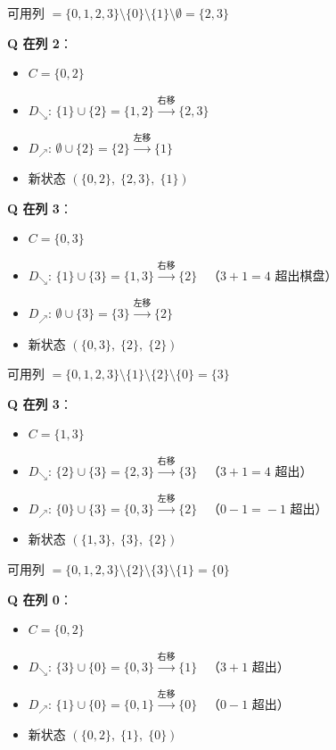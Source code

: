 \documentclass[12pt,a4paper]{article}
\begin{document}
\begin{stepbox}[S1: $(C=\{0\},\; D_\searrow=\{1\},\; D_\nearrow=\emptyset)$]
可用列 $= \{0,1,2,3\} \setminus \{0\} \setminus \{1\} \setminus \emptyset = \{2, 3\}$

\textbf{Q 在列 2}：
\begin{itemize}[nosep]
  \item $C = \{0,2\}$
  \item $D_\searrow$: $\{1\} \cup \{2\} = \{1,2\} \xrightarrow{\text{右移}} \{2,3\}$
  \item $D_\nearrow$: $\emptyset \cup \{2\} = \{2\} \xrightarrow{\text{左移}} \{1\}$
  \item 新状态 $(\{0,2\},\;\{2,3\},\;\{1\})$
\end{itemize}

\textbf{Q 在列 3}：
\begin{itemize}[nosep]
  \item $C = \{0,3\}$
  \item $D_\searrow$: $\{1\} \cup \{3\} = \{1,3\} \xrightarrow{\text{右移}} \{2\}$ \ \small（$3\!+\!1\!=\!4$ 超出棋盘）
  \item $D_\nearrow$: $\emptyset \cup \{3\} = \{3\} \xrightarrow{\text{左移}} \{2\}$
  \item 新状态 $(\{0,3\},\;\{2\},\;\{2\})$
\end{itemize}
\end{stepbox}

\begin{stepbox}[S2: $(C=\{1\},\; D_\searrow=\{2\},\; D_\nearrow=\{0\})$]
可用列 $= \{0,1,2,3\} \setminus \{1\} \setminus \{2\} \setminus \{0\} = \{3\}$

\textbf{Q 在列 3}：
\begin{itemize}[nosep]
  \item $C = \{1,3\}$
  \item $D_\searrow$: $\{2\} \cup \{3\} = \{2,3\} \xrightarrow{\text{右移}} \{3\}$ \ \small（$3\!+\!1\!=\!4$ 超出）
  \item $D_\nearrow$: $\{0\} \cup \{3\} = \{0,3\} \xrightarrow{\text{左移}} \{2\}$ \ \small（$0\!-\!1\!=\!-1$ 超出）
  \item 新状态 $(\{1,3\},\;\{3\},\;\{2\})$
\end{itemize}
\end{stepbox}

\begin{stepbox}[S3: $(C=\{2\},\; D_\searrow=\{3\},\; D_\nearrow=\{1\})$]
可用列 $= \{0,1,2,3\} \setminus \{2\} \setminus \{3\} \setminus \{1\} = \{0\}$

\textbf{Q 在列 0}：
\begin{itemize}[nosep]
  \item $C = \{0,2\}$
  \item $D_\searrow$: $\{3\} \cup \{0\} = \{0,3\} \xrightarrow{\text{右移}} \{1\}$ \ \small（$3\!+\!1$ 超出）
  \item $D_\nearrow$: $\{1\} \cup \{0\} = \{0,1\} \xrightarrow{\text{左移}} \{0\}$ \ \small（$0\!-\!1$ 超出）
  \item 新状态 $(\{0,2\},\;\{1\},\;\{0\})$
\end{itemize}
\end{stepbox}
\end{document}

